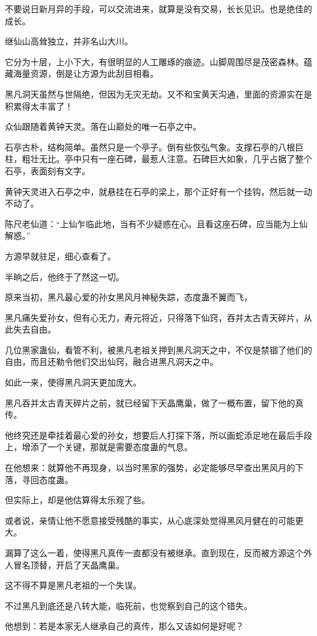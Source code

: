 \begin{this_body}
不要说日新月异的手段，可以交流进来，就算是没有交易，长长见识。也是绝佳的成长。

继仙山高耸独立，并非名山大川。

它分为十层，上小下大，有很明显的人工雕琢的痕迹。山脚周围尽是茂密森林。蕴藏海量资源，倒是让方源为此刮目相看。

黑凡洞天虽然与世隔绝，但因为无灾无劫。又不和宝黄天沟通，里面的资源实在是积累得太丰富了！

众仙跟随着黄钟天灵。落在山巅处的唯一石亭之中。

石亭古朴，结构简单。虽然只是一个亭子。倒有些恢弘气象。支撑石亭的八根巨柱，粗壮无比。亭中只有一座石碑，最惹人注意。石碑巨大如象，几乎占据了整个石亭，表面刻有文字。

黄钟天灵进入石亭之中，就悬挂在石亭的梁上，那个正好有一个挂钩，然后就一动不动了。

陈尺老仙道：“上仙乍临此地，当有不少疑惑在心。且看这座石碑，应当能为上仙解惑。”

方源早就驻足，细心查看了。

半晌之后，他终于了然这一切。

原来当初，黑凡最心爱的孙女黑风月神秘失踪，态度蛊不翼而飞，

黑凡痛失爱孙女，但有心无力，寿元将近，只得落下仙窍，吞并太古青天碎片，从此失去自由。

几位黑家蛊仙，看管不利，被黑凡老祖关押到黑凡洞天之中，不仅是禁锢了他们的自由，而且还勒令他们交出仙窍，融合进黑凡洞天之中。

如此一来，使得黑凡洞天更加庞大。

黑凡吞并太古青天碎片之前，就已经留下天晶鹰巢，做了一概布置，留下他的真传。

他终究还是牵挂着最心爱的孙女，想要后人打探下落，所以画蛇添足地在最后手段上，增添了一个关键，那就是需要态度蛊的气息。

在他想来：就算他不再现身，以当时黑家的强势，必定能够尽早查出黑风月的下落，寻回态度蛊。

但实际上，却是他估算得太乐观了些。

或者说，亲情让他不愿意接受残酷的事实，从心底深处觉得黑风月健在的可能更大。

漏算了这么一着，使得黑凡真传一直都没有被继承。直到现在，反而被方源这个外人冒名顶替，开启了天晶鹰巢。

这不得不算是黑凡老祖的一个失误。

不过黑凡到底还是八转大能，临死前，也觉察到自己的这个错失。

他想到：若是本家无人继承自己的真传，那么又该如何是好呢？


\end{this_body}
